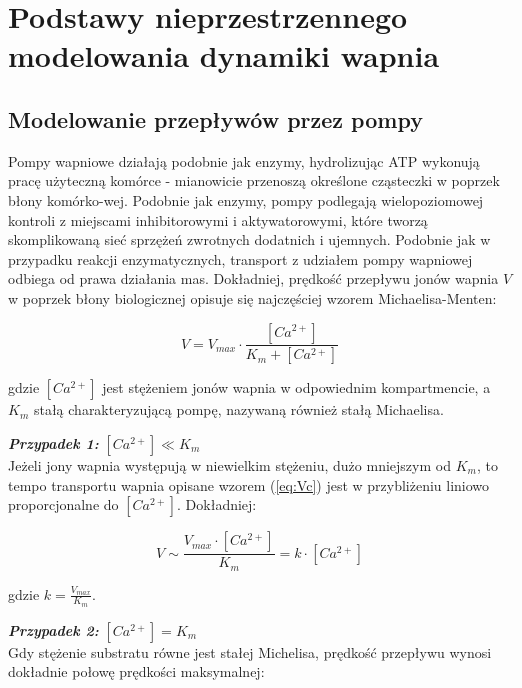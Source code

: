 \chapter{Podstawy nieprzestrzennego modelowania dynamiki wapnia}
\label{chap:modelowanie:osc}


\section{Modelowanie przepływów przez pompy}

Pompy wapniowe działają podobnie jak enzymy, hydrolizując ATP wykonują pracę użyteczną komórce - mianowicie przenoszą określone cząsteczki w poprzek błony komórko-wej. Podobnie jak enzymy, pompy podlegają wielopoziomowej kontroli z miejscami inhibitorowymi i aktywatorowymi, które tworzą skomplikowaną sieć sprzężeń zwrotnych dodatnich i ujemnych. Podobnie jak w przypadku reakcji enzymatycznych, transport z udziałem pompy wapniowej odbiega od prawa działania mas. Dokładniej, prędkość przepływu jonów wapnia $V$ w poprzek błony biologicznej opisuje się najczęściej wzorem Michaelisa-Menten:


\begin{equation}
V = V_{max} \cdot \frac{[Ca^{2+}]}{K_m + [Ca^{2+}]}
\label{eq:Vc}
\end{equation}

\noindent gdzie $[Ca^{2+}]$ jest stężeniem jonów wapnia w odpowiednim kompartmencie, a $K_m$ stałą charakteryzującą pompę, nazywaną również stałą Michaelisa.

\bigskip

\noindent \textbf{\textit{Przypadek 1:}} $[Ca^{2+}] \ll K_m$\\
\noindent Jeżeli jony wapnia występują w niewielkim stężeniu, dużo mniejszym od $K_m$, to tempo transportu wapnia opisane wzorem (\ref{eq:Vc}) jest w przybliżeniu liniowo proporcjonalne do $[Ca^{2+}]$. Dokładniej:

\begin{equation}
V \sim \frac{V_{max} \cdot [Ca^{2+}]}{K_m} = k \cdot [Ca^{2+}]
\end{equation}

\noindent gdzie $k=\frac{V_{max}}{K_m}$.
\bigskip


\noindent \textbf{\textit{Przypadek 2:}} $[Ca^{2+}] = K_m$\\

Gdy stężenie substratu równe jest stałej Michelisa, prędkość przepływu wynosi dokładnie połowę prędkości maksymalnej:

